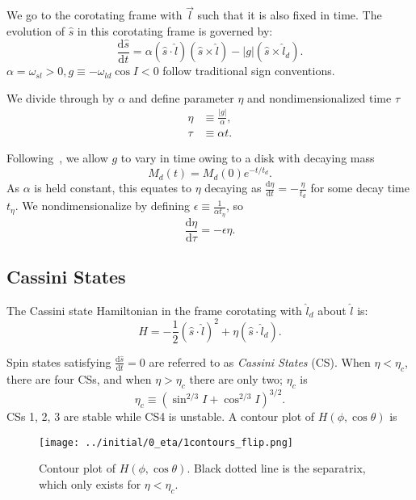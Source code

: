 \documentclass[
        fleqn,
        usenatbib,
    ]{mnras}
\newcommand*{\rd}[2]{\frac{\mathrm{d}#1}{\mathrm{d}#2}}
\newcommand*{\abs}[1]{\left|#1\right|}
\newcommand*{\p}[1]{\left(#1\right)}
\begin{document}
We go to the corotating frame with $\vec{l}$ such that it is also fixed in time.
The evolution of $\hat{s}$ in this corotating frame is governed by:
\begin{equation}
    \rd{\hat{s}}{t} = \alpha \p{\hat{s} \cdot \hat{l}}
            \p{\hat{s} \times \hat{l}}
        - \abs{g}\p{\hat{s} \times \hat{l}_d}.
        \label{eq:dsdt_base}
\end{equation}
$\alpha = \omega_{sl} > 0, g \equiv -\omega_{ld}\cos I < 0$ follow traditional
sign conventions.

We divide through by $\alpha$ and define parameter $\eta$ and nondimensionalized
time $\tau$
\begin{align}
    \eta &\equiv \frac{\abs{g}}{\alpha}\label{eq:eta},\\
    \tau &\equiv \alpha t.
\end{align}

Following~\cite{millholland_disk}, we allow $g$ to vary in time owing to a
disk with decaying mass
\begin{equation}
    M_d(t) = M_d(0)e^{-t/t_d}.
\end{equation}
As $\alpha$ is held constant, this equates to $\eta$ decaying as $\rd{\eta}{t} =
-\frac{\eta}{t_d}$ for some decay time $t_\eta$. We nondimensionalize by
defining $\epsilon \equiv \frac{1}{\alpha t_\eta}$, so
\begin{equation}
    \rd{\eta}{\tau} = -\epsilon \eta.
\end{equation}

\subsection{Cassini States}\label{ss:cs}

The Cassini state Hamiltonian in the frame corotating with $\hat{l}_d$ about
$\hat{l}$ is:
\begin{equation}
    H = -\frac{1}{2}\p{\hat{s} \cdot \hat{l}}^2
        + \eta \p{\hat{s} \cdot \hat{l}_d}.
\end{equation}

Spin states satisfying $\rd{\hat{s}}{t} = 0$ are referred to as \emph{Cassini
States} (CS). When $\eta < \eta_c$, there are four CSs, and when $\eta > \eta_c$
there are only two; $\eta_c$ is \citep{henrard1987,ward2004I}
\begin{equation}
    \eta_c \equiv \p{\sin^{2/3}I + \cos^{2/3}I}^{3/2}.
\end{equation}
CSs 1, 2, 3 are stable while CS4 is unstable. A contour plot of $H\p{\phi, \cos
\theta}$ is
\begin{figure}
    \centering
    \texttt{[image: ../initial/0\_eta/1contours\_flip.png]}
    \caption{Contour plot of $H\p{\phi, \cos \theta}$. Black dotted line is the
    separatrix, which only exists for $\eta < \eta_c$.}\label{fig:eq_1contours}
\end{figure}
\end{document}
